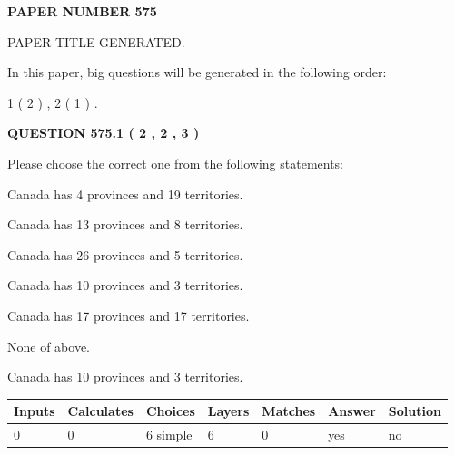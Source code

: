 \documentclass[12pt]{article}
\begin{document}
   
 {\textbf{ \Large{ PAPER NUMBER  575  }}}
   
   
\vspace{0.2in}
   
   
   
   
   
   
   
   
 \vspace{0.2in}
 
 
 
 
   
   
 PAPER TITLE GENERATED.
   
   
   
\vspace{0.2in}
   
In this paper, big questions will be generated in the following order: 
   
   
   1 ( 2 )
 ,
   2 ( 1 )
 .
  
\vspace{0.2in}
  
{\textbf{\Large{QUESTION
575.1 
 ( 2 , 2 , 3 )
}}}
  
  
Please choose the correct one from the following statements:
 
 
Canada has   4 provinces and  19 territories.
 
 
Canada has  13 provinces and  8 territories.
 
 
Canada has  26 provinces and  5 territories.
 
 
Canada has 10  provinces and 3 territories.
 
 
Canada has  17 provinces and  17 territories.
 
 
 None of above.
 
 
\noindent{}
 
 
Canada has 10  provinces and 3 territories.
 
 
\noindent{}
 
 
   
   
   
   
\noindent\begin{tabular}{|l|l|l|l|l|l|l|}
 \hline
Inputs & Calculates & Choices & Layers & Matches & Answer & Solution \\ \hline
 0  & 
 0  & 
 6
  simple  
  & 
 6  & 
 0  & 
  yes & 
  no 
  \\ \hline
 \end{tabular}
   
\end{document}
